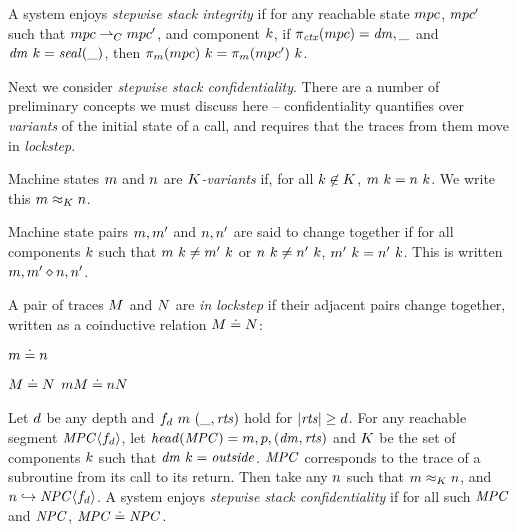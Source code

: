 \documentclass[acmsmall,review,anonymous]{acmart}\settopmatter{printfolios=true,printccs=false,printacmref=false}
\begin{document}
 A system enjoys {\em stepwise stack integrity} if for any reachable state
\(mpc\), \(mpc'\) such that \(mpc \overset{}{\rightharpoonup}_C mpc'\),
and component \(k\), if \(\pi_{\mathit{ctx}}(mpc) = \mathit{dm},\_\) and
\(\mathit{dm} ~ k = \mathit{seal(\_)}\), then \(\pi_m(mpc) ~ k =
\pi_m(mpc') ~ k\).

Next we consider {\em stepwise stack confidentiality}. There are a number of preliminary
concepts we must discuss here -- confidentiality quantifies over {\em variants} of the
initial state of a call, and requires that the traces from them move in {\em lockstep}.

 Machine states \(m\) and \(n\) are {\em \(K\)-variants} if, for
all \(k \not \in K\), \(m ~ k = n ~ k\). We write
this \(m \approx_K n\).

 Machine state pairs \(m,m'\) and \(n,n'\) are said to change together
if for all components \(k\) such that \(m ~ k \not = m' ~ k\) or
\(n ~ k \not = n' ~ k\), \(m' ~ k = n' ~ k\).
This is written \(m,m' \diamond n,n'\).

 A pair of traces \(M\) and \(N\) are {\em in lockstep} if their adjacent pairs
change together, written as a coinductive relation \(M \doteq
N\):

\begin{minipage}{.3\textwidth}
\judgment{}
         {\(m \doteq n\)}
\end{minipage}
\begin{minipage}{.6\textwidth}
\judgmenttwo{\(\mach, \head(\machT) \diamond \nach, \head(\nachT)\)}
            {\(M \doteq N\)}
            {\(m M \doteq n N\)}
\end{minipage}

 Let \(d\) be any depth and \(f_d ~ m ~ (\_, \mathit{rts})\) hold for
\(|\mathit{rts}| \geq d\). For any reachable segment \(\mathit{MPC} \langle f_d \rangle\),
let \(\mathit{head}(\mathit{MPC}) = m,p,(\mathit{dm},\mathit{rts})\) and
\(K\) be the set of components \(k\) such that \(\mathit{dm} ~ k = \mathit{outside}\).
\(\mathit{MPC}\) corresponds to the trace of a subroutine from its call to its return.
Then take any \(n\) such that \(m \approx_K n\), and
\(n \hookrightarrow \mathit{NPC}\langle f_d \rangle\). A system enjoys
{\em stepwise stack confidentiality} if for all such \(\mathit{MPC}\) and \(\mathit{NPC}\),
\(\mathit{MPC} \doteq \mathit{NPC}\).
\end{document}
